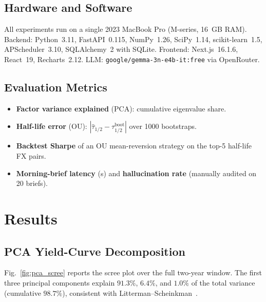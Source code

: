 \documentclass[conference]{IEEEtran}
\begin{document}
\subsection{Hardware and Software}
All experiments run on a single 2023 MacBook Pro (M-series, 16~GB RAM). Backend: Python~3.11, FastAPI~0.115, NumPy~1.26, SciPy~1.14, scikit-learn~1.5, APScheduler~3.10, SQLAlchemy~2 with SQLite. Frontend: Next.js~16.1.6, React~19, Recharts~2.12. LLM: \texttt{google/gemma-3n-e4b-it:free} via OpenRouter.

\subsection{Evaluation Metrics}
\begin{itemize}
\item \textbf{Factor variance explained} (PCA): cumulative eigenvalue share.
\item \textbf{Half-life error} (OU): $|\hat\tau_{1/2} - \tau_{1/2}^{\text{boot}}|$ over 1000 bootstraps.
\item \textbf{Backtest Sharpe} of an OU mean-reversion strategy on the top-5 half-life FX pairs.
\item \textbf{Morning-brief latency} (s) and \textbf{hallucination rate} (manually audited on 20 briefs).
\end{itemize}

\section{Results}
\label{sec:results}

\subsection{PCA Yield-Curve Decomposition}
Fig.~\ref{fig:pca_scree} reports the scree plot over the full two-year window. The first three principal components explain $91.3\%$, $6.4\%$, and $1.0\%$ of the total variance (cumulative $98.7\%$), consistent with Litterman--Scheinkman~\cite{litterman1991common}.
\end{document}
